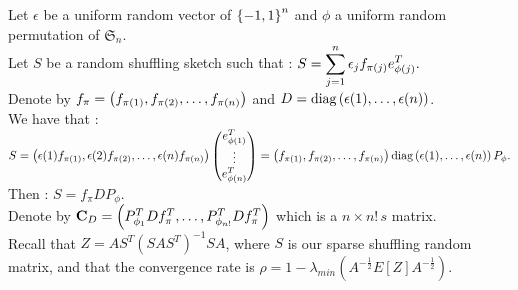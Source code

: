  Let $\epsilon$ be a uniform random vector of $\left\{-1,1\right\}^{n}$ and $\phi$ a uniform random permutation of $\mathfrak{S}_{n}$.\\
Let $S$ be a random shuffling sketch such that : $S = \displaystyle\sum_{j=1}^{n} \epsilon_{j}f_{\pi(j)}e_{\phi(j)}^{T} .$\\

Denote by $f_{\pi} = \left( f_{\pi(1)}, f_{\pi(2)},\dots, f_{\pi(n)} \right)$ and $D = \text{diag}\left(\epsilon(1),\dots,\epsilon(n)\right)$.\\
We have that :\\
$S = \left( \epsilon(1)f_{\pi(1)},\epsilon(2)f_{\pi(2)},\dots,\epsilon(n)f_{\pi(n)} \right) \begin{pmatrix} e_{\phi(1)}^{T} \\ \vdots \\ e_{\phi(n)}^{T} \end{pmatrix} = \left( f_{\pi(1)}, f_{\pi(2)},\dots, f_{\pi(n)} \right) \text{diag}\left(\epsilon(1),\dots,\epsilon(n)\right) P_{\phi}.$\\
Then : $S = f_{\pi} D P_{\phi}$.\\

Denote by $\bold{C}_{D} = \left(P_{\phi_{1}}^{T} D f_{\pi}^{T},\dots,P_{\phi_{n!}}^{T} D f_{\pi}^{T} \right) $ which is a $ n \times n! \,s$ matrix.\\


Recall that $Z = A S^{T} (S A S^{T})^{-1} S A$, where $S$ is our sparse shuffling random matrix, and that the convergence rate is  $\rho = 1 - \lambda_{min}(A^{-\frac12}E[Z]A^{-\frac12}  )$.\\


